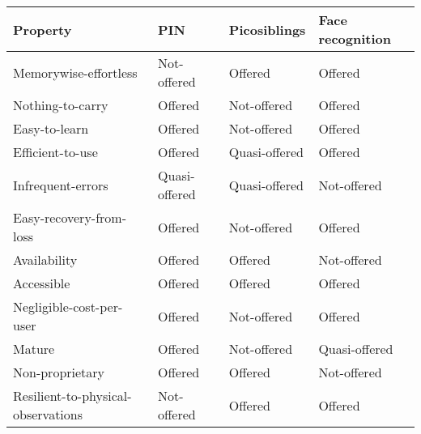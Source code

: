 \begin{table}
    \begin{tabular}{l|l|l|l}
    Property                            & PIN           					& Picosiblings  					& Face recognition \\ \hline
    Memorywise-effortless               & \cellcolor{red!25}Not-offered   	& \cellcolor{green!25}Offered       & \cellcolor{green!25}Offered          \\
    Nothing-to-carry                    & \cellcolor{green!25}Offered       & \cellcolor{red!25}Not-offered   & \cellcolor{green!25}Offered          \\
    Easy-to-learn                       & \cellcolor{green!25}Offered       & \cellcolor{red!25}Not-offered   & \cellcolor{green!25}Offered          \\
    Efficient-to-use                    & \cellcolor{green!25}Offered       & \cellcolor{yellow!25}Quasi-offered & \cellcolor{green!25}Offered          \\
    Infrequent-errors                   & \cellcolor{yellow!25}Quasi-offered & \cellcolor{yellow!25}Quasi-offered & \cellcolor{red!25}Not-offered      \\
    Easy-recovery-from-loss             & \cellcolor{green!25}Offered       & \cellcolor{red!25}Not-offered   & \cellcolor{green!25}Offered          \\
    Availability                        & \cellcolor{green!25}Offered       & \cellcolor{green!25}Offered       & \cellcolor{red!25}Not-offered      \\ \hline
    Accessible                          & \cellcolor{green!25}Offered       & \cellcolor{green!25}Offered       & \cellcolor{green!25}Offered          \\
    Negligible-cost-per-user            & \cellcolor{green!25}Offered       & \cellcolor{red!25}Not-offered   & \cellcolor{green!25}Offered          \\
    Mature                              & \cellcolor{green!25}Offered       & \cellcolor{red!25}Not-offered   & \cellcolor{yellow!25}Quasi-offered    \\
    Non-proprietary                     & \cellcolor{green!25}Offered       & \cellcolor{green!25}Offered       & \cellcolor{red!25}Not-offered      \\ \hline
    Resilient-to-physical-observations  & \cellcolor{red!25}Not-offered   & \cellcolor{green!25}Offered       & \cellcolor{green!25}Offered          \\

\end{tabular}
\end{table}
